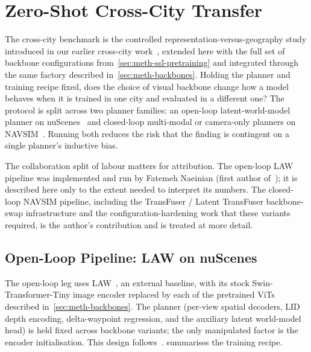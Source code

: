 \section{Zero-Shot Cross-City Transfer}
\label{sec:meth-phase1-cc}

The cross-city benchmark is the controlled representation-versus-geography study introduced in our earlier cross-city work~\cite{naeinian-cross-city-2026}, extended here with the full set of backbone configurations from~\ref{sec:meth-ssl-pretraining} and integrated through the same factory described in~\ref{sec:meth-backbones}. Holding the planner and training recipe fixed, does the choice of visual backbone change how a model behaves when it is trained in one city and evaluated in a different one? The protocol is split across two planner families: an open-loop latent-world-model planner on nuScenes~\cite{caesar-nuscenes-2020} and closed-loop multi-modal or camera-only planners on NAVSIM~\cite{dauner-navsim-2024}. Running both reduces the risk that the finding is contingent on a single planner's inductive bias.

The collaboration split of labour matters for attribution. The open-loop LAW pipeline was implemented and run by Fatemeh Naeinian (first author of~\cite{naeinian-cross-city-2026}); it is described here only to the extent needed to interpret its numbers. The closed-loop NAVSIM pipeline, including the TransFuser / Latent TransFuser backbone-swap infrastructure and the configuration-hardening work that these variants required, is the author's contribution and is treated at more detail.

\subsection{Open-Loop Pipeline: LAW on nuScenes}
\label{sec:meth-phase1-law}

The open-loop leg uses LAW~\cite{li-law-2024}, an external baseline, with its stock Swin-Transformer-Tiny image encoder replaced by each of the pretrained ViTs described in~\ref{sec:meth-backbones}. The planner (per-view spatial decoders, LID depth encoding, delta-waypoint regression, and the auxiliary latent world-model head) is held fixed across backbone variants; the only manipulated factor is the encoder initialisation. This design follows~\cite{naeinian-cross-city-2026}.  summarises the training recipe.

